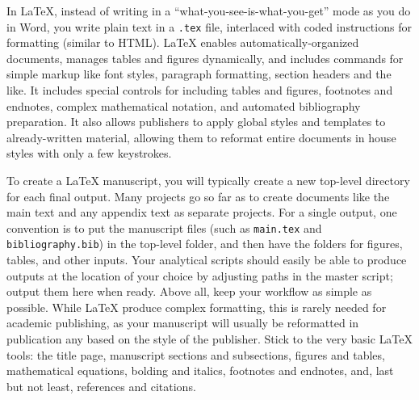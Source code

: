 In {\LaTeX}, instead of writing in a
``what-you-see-is-what-you-get'' mode as you do in Word,
you write plain text in a \texttt{.tex} file,
interlaced with coded instructions for formatting (similar to HTML).
{\LaTeX} enables automatically-organized documents,
manages tables and figures dynamically,
and includes commands for simple markup
like font styles, paragraph formatting, section headers and the like.
It includes special controls for including tables and figures,
footnotes and endnotes, complex mathematical notation, and automated bibliography preparation.
It also allows publishers to apply global styles and templates to already-written material,
allowing them to reformat entire documents in house styles with only a few keystrokes.

To create a {\LaTeX} manuscript,
you will typically create a new top-level directory for each final output.
Many projects go so far as to create documents like the main text
and any appendix text as separate projects.
For a single output, one convention is to put the manuscript files
(such as \texttt{main.tex} and \texttt{bibliography.bib})
in the top-level folder,
and then have the folders for figures, tables, and other inputs.
Your analytical scripts should easily be able to produce outputs
at the location of your choice by adjusting paths in the master script;
output them here when ready.
Above all, keep your workflow as simple as possible.
While {\LaTeX}  produce complex formatting,
this is rarely needed for academic publishing,
as your manuscript will usually be reformatted in publication any
based on the style of the publisher.
Stick to the very basic {\LaTeX} tools:
the title page, manuscript sections and subsections,
figures and tables, mathematical equations,
bolding and italics, footnotes and endnotes,
and, last but not least, references and citations.

